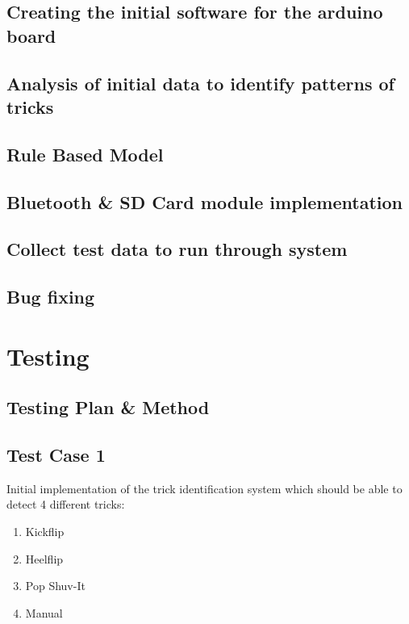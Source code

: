 \subsection{Creating the initial software for the arduino board}\label{initalboardsoftware}

\subsection{Analysis of initial data to identify patterns of tricks}\label{initialdatacapture}

\subsection{Rule Based Model}\label{rulebasedmodels}

\subsection{Bluetooth \& SD Card module implementation}\label{bluetoothsdcard}

\subsection{Collect test data to run through system}\label{collecttestdata}

\subsection{Bug fixing}\label{bugfixing}

\section{Testing}\label{testing}

\subsection{Testing Plan \& Method}\label{testplanmethod}

\subsection{Test Case 1}\label{testcase1}

Initial implementation of the trick identification system which should be able to detect 4 different tricks:

\begin{enumerate}
\item Kickflip
\item Heelflip
\item Pop Shuv-It
\item Manual
\end{enumerate}

